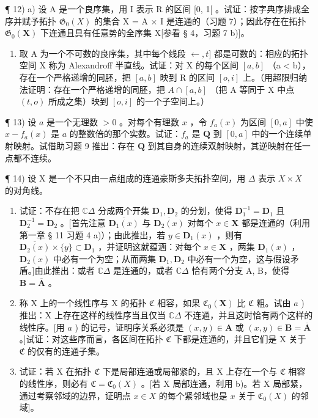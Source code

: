 ¶ 12) a) 设 A 是一个良序集，用 I 表示 R 的区间 {[}0, 1{[} 。试证：按字典序排成全序并赋予拓扑 \(\mathfrak{G}_{0}(X)\) 的集合 X = A × I 是连通的（习题 7）；因此存在在拓扑 \(\mathfrak{G}_{0}(\mathbf{X})\) 下连通且具有任意势的全序集 X{[}参看 § 4，习题 7 b){]}。

\begin{enumerate}
\def\labelenumi{\alph{enumi})}
\setcounter{enumi}{1}
\tightlist
\item
取 A 为一个不可数的良序集，其中每个线段 \(\leftarrow, t]\) 都是可数的：相应的拓扑空间 X 称为 Alexandroff 半直线。试证：对 X 的每个区间 \([a, b]\) （a \textless{} b），存在一个严格递增的同胚，把 \([a, b]\) 映到 R 的区间 \([o, i]\) 上。（用超限归纳法证明：存在一个严格递增的同胚，把 \(A \cap [a, b]\) （把 A 等同于 X 中点 \((t, o)\) 所成之集）映到 \([o, i]\) 的一个子空间上。）
\end{enumerate}

¶ 13) 设 \(a\) 是一个无理数 \(>0\) 。对每个有理数 \(x\) ，令 \(f_{a}(x)\) 为区间 \([0, a]\) 中使 \(x - f_{a}(x)\) 是 \(a\) 的整数倍的那个实数。试证：\(f_{a}\) 是 \(\mathbf{Q}\) 到 \([0, a]\) 中的一个连续单射映射。试借助习题 9 推出：存在 \(\mathbf{Q}\) 到其自身的连续双射映射，其逆映射在任一点都不连续。

¶ 14) 设 X 是一个不只由一点组成的连通豪斯多夫拓扑空间，用 \(\Delta\) 表示 \(X \times X\) 的对角线。

\begin{enumerate}
\def\labelenumi{\alph{enumi})}
\item
试证：不存在把 \(\mathbb{C}\Delta\) 分成两个开集 \(\mathbf{D}_1, \mathbf{D}_2\) 的分划，使得 \(\mathbf{D}_1^{-1} = \mathbf{D}_1\) 且 \(\mathbf{D}_2^{-1} = \mathbf{D}_2\) 。{[}首先注意 \(\overline{\mathbf{D}_1(x)}\) 与 \(\overline{\mathbf{D}_2(x)}\) 对每个 \(x \in \mathbf{X}\) 都是连通的（利用第一章 § 11 习题 4 a)）；由此推出，若 \(y \in \mathbf{D}_1(x)\) ，则有 \(\overline{\mathbf{D}_2(x)} \times \{y\} \subset \mathbf{D}_1\) ，并证明这就蕴涵：对每个 \(x \in \mathbf{X}\) ，两集 \(\mathbf{D}_1(x)\) ， \(\mathbf{D}_2(x)\) 中必有一个为空；从而两集 \(\mathbf{D}_1, \mathbf{D}_2\) 中必有一个为空，这与假设矛盾。{]}由此推出：或者 \(\mathbb{C}\Delta\) 是连通的，或者 \(\mathbb{C}\Delta\) 恰有两个分支 A, B，使得 \(\mathbf{B} = \overline{\mathbf{A}}\) 。
\item
称 X 上的一个线性序与 X 的拓扑 \(\mathfrak{C}\) 相容，如果 \(\mathfrak{C}_0(\mathbf{X})\) 比 \(\mathfrak{C}\) 粗。试由 \(a\) ) 推出：X 上存在这样的线性序当且仅当 \(\mathbb{C}\Delta\) 不连通，并且这时恰有两个这样的线性序。{[}用 \(a\) ) 的记号，证明序关系必须是 \((x, y) \in \mathbf{A}\) 或 \((x, y) \in \mathbf{B} = \overline{\mathbf{A}}\) 。{]}试证：对这些序而言，各区间在拓扑 \(\mathfrak{C}\) 下都是连通的，并且它们是 X 关于 \(\mathfrak{C}\) 的仅有的连通子集。
\item
试证：若 X 在拓扑 \(\mathfrak{C}\) 下是局部连通或局部紧的，且 X 上存在一个与 \(\mathfrak{C}\) 相容的线性序，则必有 \(\mathfrak{C} = \mathfrak{C}_0(X)\) 。{[}若 X 局部连通，利用 b)。若 X 局部紧，通过考察邻域的边界，证明点 \(x \in X\) 的每个紧邻域也是 \(x\) 关于 \(\mathfrak{C}_0(X)\) 的邻域{]}。
\end{enumerate}

